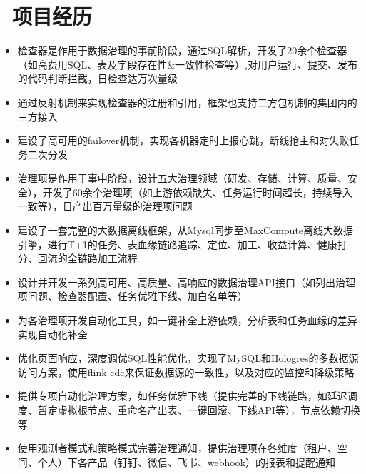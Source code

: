 \documentclass{resume}
\begin{document}
\section{\faUsers\ 项目经历}
\vspace{-0.5ex}
\begin{onehalfspacing}
\begin{itemize}
  \item 检查器是作用于数据治理的事前阶段，通过SQL解析，开发了20余个检查器（如高费用SQL、表及字段存在性\&一致性检查等）,对用户运行、提交、发布的代码判断拦截，日检查达万次量级
  \item 通过反射机制来实现检查器的注册和引用，框架也支持二方包机制的集团内的三方接入
  \item 建设了高可用的failover机制，实现各机器定时上报心跳，断线抢主和对失败任务二次分发
\end{itemize}
\end{onehalfspacing}

\vspace{-1.5ex}

\vspace{-0.5ex}
\begin{onehalfspacing}
\begin{itemize}
  \item 治理项是作用于事中阶段，设计五大治理领域（研发、存储、计算、质量、安全），开发了60余个治理项（如上游依赖缺失、任务运行时间超长，持续导入一致等），日产出百万量级的治理项问题
  \item 建设了一套完整的大数据离线框架，从Mysql同步至MaxCompute离线大数据引擎，进行T+1的任务、表血缘链路追踪、定位、加工、收益计算、健康打分、回流的全链路加工流程
  \item 设计并开发一系列高可用、高质量、高响应的数据治理API接口（如列出治理项问题、检查器配置、任务优雅下线、加白名单等）
\end{itemize}
\end{onehalfspacing}

\vspace{-0.5ex}
\begin{onehalfspacing}
\begin{itemize}
  \item 为各治理项开发自动化工具，如一键补全上游依赖，分析表和任务血缘的差异实现自动化补全
  \item 优化页面响应，深度调优SQL性能优化，实现了MySQL和Hologres的多数据源访问方案，使用flink cdc来保证数据源的一致性，以及对应的监控和降级策略
  \item 提供专项自动化治理方案，如任务优雅下线（提供完善的下线链路，如延迟调度、暂定虚拟根节点、重命名产出表、一键回滚、下线API等），节点依赖切换等
  \item 使用观测者模式和策略模式完善治理通知，提供治理项在各维度（租户、空间、个人）下各产品（钉钉、微信、飞书、webhook）的报表和提醒通知
\end{itemize}
\end{onehalfspacing}
\end{document}
